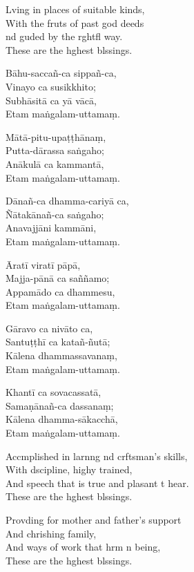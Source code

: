 Lving in places of suitable kinds,\\
With the fruts of past god deeds\\
nd guded by the rghtfl way.\\
These are the hghest blssings.

\clearpage

Bāhu-saccañ-ca sippañ-ca,\\%
Vinayo ca susikkhito;\\
Subhāsitā ca yā vācā,\\
Etam maṅgalam-uttamaṃ.

Mātā-pitu-upaṭṭhānaṃ,\\
Putta-dārassa saṅgaho;\\
Anākulā ca kammantā,\\
Etam maṅgalam-uttamaṃ.

Dānañ-ca dhamma-cariyā ca,\\
Ñātakānañ-ca saṅgaho;\\
Anavajjāni kammāni,\\
Etam maṅgalam-uttamaṃ.

Āratī viratī pāpā,\\
Majja-pānā ca saññamo;\\
Appamādo ca dhammesu,\\
Etam maṅgalam-uttamaṃ.

Gāravo ca nivāto ca,\\
Santuṭṭhī ca katañ-ñutā;\\
Kālena dhammassavanaṃ,\\
Etam maṅgalam-uttamaṃ.

Khantī ca sovacassatā,\\
Samaṇānañ-ca dassanaṃ;\\
Kālena dhamma-sākacchā,\\
Etam maṅgalam-uttamaṃ.

\clearpage

Accmplished in larnng nd crftsman's skills,\\%
With dscipline, highy trained,\\
And speech that is true and plasant t hear.\\
These are the hghest blssings.

Provding for mother and father's support\\
And chrishing family,\\
And ways of work that hrm n being,\\
These are the hghest blssings.


